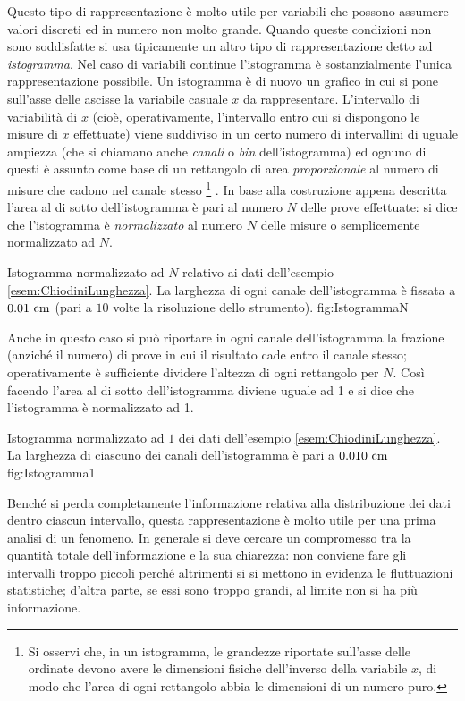 Questo tipo di rappresentazione \`e molto utile per variabili che possono
assumere valori discreti ed in numero non molto grande.
Quando queste condizioni non sono soddisfatte si usa tipicamente un altro
tipo di rappresentazione detto ad {\itshape istogramma}.
Nel caso di variabili continue l'istogramma \`e sostanzialmente l'unica
rappresentazione possibile.
Un istogramma \`e di nuovo un grafico in cui si pone sull'asse
delle ascisse la variabile casuale $x$ da rappresentare.
L'intervallo di variabilit\`a di $x$ (cio\`e, operativamente, l'intervallo
entro cui si dispongono le misure di $x$ effettuate) viene suddiviso in un
certo numero di intervallini di uguale ampiezza (che si chiamano anche
{\itshape canali} o {\itshape bin} dell'istogramma) ed ognuno di questi \`e
assunto come base di un rettangolo di area {\itshape proporzionale} al numero
di misure che cadono nel canale stesso%
\footnote{
Si osservi che, in un istogramma, le grandezze riportate sull'asse delle
ordinate devono avere le dimensioni fisiche dell'inverso della variabile $x$,
di modo che l'area di ogni rettangolo abbia le dimensioni di un numero puro.
}%
.
In base alla costruzione appena descritta l'area al di sotto dell'istogramma
\`e pari al numero $N$ delle prove effettuate: si dice che l'istogramma
\`e {\itshape normalizzato} al numero $N$ delle misure o semplicemente
normalizzato ad $N$.

\panelfig
{}
{Istogramma normalizzato ad $N$ relativo ai dati dell'esempio
\ref{esem:ChiodiniLunghezza}. La larghezza di ogni canale
dell'istogramma \`e fissata a $0.01 ~{\rm cm}$ (pari a $10$ volte la risoluzione
dello strumento).}
{fig:IstogrammaN}

Anche in questo caso si pu\`o riportare in ogni canale dell'istogramma
la frazione (anzich\'e il numero) di prove in cui il risultato cade entro
il canale stesso; operativamente \`e sufficiente dividere l'altezza di ogni
rettangolo per $N$. Cos\`i facendo l'area al di sotto dell'istogramma
diviene uguale ad 1 e si dice che l'istogramma \`e normalizzato ad 1.

\panelfig
{}
{Istogramma normalizzato ad $1$ dei dati dell'esempio
\ref{esem:ChiodiniLunghezza}. La larghezza di ciascuno dei canali
dell'istogramma \`e pari a $0.010 ~{\rm cm}$}
{fig:Istogramma1}

Bench\'e si perda completamente l'informazione relativa alla distribuzione
dei dati dentro ciascun intervallo, questa rappresentazione \`e molto utile
per una prima analisi di un fenomeno.
In generale si deve cercare un compromesso tra la quantit\`a totale
dell'informazione e la sua chiarezza: non conviene fare gli intervalli troppo
piccoli perch\'e altrimenti si si mettono in evidenza le fluttuazioni
statistiche; d'altra parte, se essi sono troppo grandi, al limite non si ha
pi\`u informazione.

